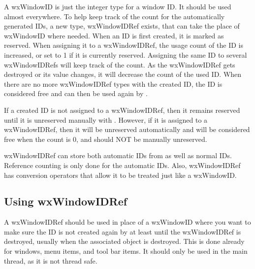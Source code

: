 A wxWindowID is just the integer type for a window ID.  It should be used almost
everywhere.  To help keep track of the count for the automatically generated IDs,
a new type, wxWindowIDRef exists, that can take the place of wxWindowID where needed.
When an ID is first created, it is marked as reserved.  When assigning it to a
wxWindowIDRef, the usage count of the ID is increased, or set to 1 if it is currently
reserved.  Assigning the same ID to several wxWindowIDRefs will keep track of the count.
As the wxWindowIDRef gets destroyed or its value changes, it will decrease the count
of the used ID.  When there are no more wxWindowIDRef types with the created ID, the
ID is considered free and can then be used again by .

If a created ID is not assigned to a wxWindowIDRef, then it remains reserved until it
is unreserved manually with .
However, if it is assigned to a wxWindowIDRef, then it will be unreserved automatically
and will be considered free when the count is 0, and should NOT be manually unreserved.

wxWindowIDRef can store both automatic IDs from 
as well as normal IDs.  Reference counting is only done for the automatic IDs.  Also,
wxWindowIDRef has conversion operators that allow it to be treated just like a wxWindowID.

\subsection{Using wxWindowIDRef}\label{windowidsoverviewusing}

A wxWindowIDRef should be used in place of a wxWindowID where you want to make sure the
ID is not created again by 
at least until the wxWindowIDRef is destroyed, usually when the associated object is destroyed.
This is done already for windows, menu items, and tool bar items.
It should only be used in the main thread, as it is not thread safe.

